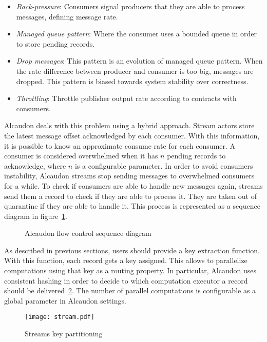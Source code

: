 \begin{itemize}
\item \textit{Back-pressure}: Consumers signal producers that they are able to
  process messages, defining message rate.
\item \textit{Managed queue pattern}: Where the consumer uses a bounded queue in
  order to store pending records.
\item \textit{Drop messages}: This pattern is an evolution of managed queue pattern. When
  the rate difference between producer and consumer is too big, messages are dropped.
  This pattern is biased towards system stability over correctness.
\item \textit{Throttling}: Throttle publisher output rate according to contracts
  with consumers.
\end{itemize}

Alcaudon deals with this problem using a hybrid approach. Stream actors store
the latest message offset acknowledged by each consumer. With this information, it
is possible to know an approximate consume rate for each consumer. A consumer is
considered overwhelmed when it has $n$ pending records to acknowledge, where $n$
is a configurable parameter. In order to avoid consumers instability, Alcaudon
streams stop sending messages to overwhelmed consumers for a while. To check if
consumers are able to handle new messages again, streams send them a record to
check if they are able to process it. They are taken out of quarantine if they
are able to handle it. This process is represented as a sequence diagram in
figure~\ref{fig:flowcontrol}.

\begin{figure}[!h]
  \centering
  \scalebox{0.5}{
    
  }
\caption{Alcaudon flow control sequence diagram}
\label{fig:flowcontrol}
\end{figure}

As described in previous sections, users should provide a key extraction
function. With this function, each record gets a key assigned. This allows to
parallelize computations using that key as a routing property. In particular,
Alcaudon uses consistent hashing in order to decide to which computation
executor a record should be delivered~\ref{fig:streamkeypart}. The number of
parallel computations is configurable as a global parameter in Alcaudon
settings.

\begin{figure}
  \centering
  \texttt{[image: stream.pdf]}
  \caption{Streams key partitioning}
  \label{fig:streamkeypart}
\end{figure}

